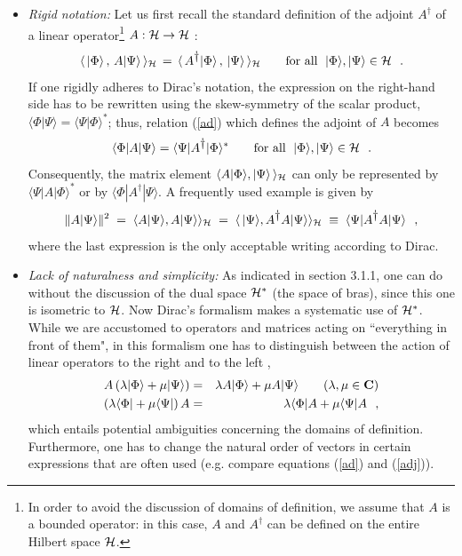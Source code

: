 \documentclass[12pt]{report}
\begin{document}
\begin{itemize}
 
\item {\em Rigid notation:}
Let us first recall the standard definition of the 
adjoint $A^{\dag}$ of a linear operator\footnote{In order to avoid 
the discussion of domains of definition, we assume that $A$ is 
a bounded operator: in this case, $A$ and $A^{\dag}$ can  
be defined on the entire Hilbert space ${\cal H}$.}
$A : {\cal H} \to {\cal H}$ :
\begin{equation}
\label{ad}
\langle \, | \Phi \rangle \, , \, A | \Psi \rangle \, \rangle _{{\cal H}}
\, = \,
\langle \, A^{\displaystyle{\dagger}} | \Phi \rangle \, ,\, |\Psi \rangle \, \rangle _{{\cal H}}
\qquad 
\mbox{for all} \ \; 
|\Phi \rangle , |\Psi \rangle \in {\cal H} 
\ \ .
\end{equation}
 If one rigidly adheres to Dirac's notation, the 
expression on the right-hand side has to be 
rewritten using the skew-symmetry of the scalar product,
$\langle \Phi | \Psi \rangle =
\langle \Psi | \Phi \rangle ^{\ast}$; thus, relation
(\ref{ad}) which defines the adjoint of $A$ becomes 
\begin{equation}
\langle \Phi | A | \Psi \rangle  =
\langle \Psi | A^{\displaystyle{\dagger}} | \Phi \rangle ^{\ast}
\qquad \mbox{for all} \ \; 
|\Phi \rangle , |\Psi \rangle \in {\cal H} 
\ \ .
\label{adj}
\end{equation}
Consequently, the matrix element 
$\langle A | \Phi \rangle , | \Psi \rangle \, \rangle _{{\cal H}}$ 
can only be represented by 
$\langle \Psi | A | \Phi \rangle ^{\ast}$ or by 
$\langle \Phi | A^{\dag} | \Psi \rangle$.
A frequently used example is given by 
\[
\| A | \Psi \rangle \|^2 \; = \;
\langle A | \Psi \rangle , A | \Psi \rangle \rangle _{{\cal H}} \; =\;
\langle \, |\Psi \rangle ,A^{\displaystyle{\dagger}} A|\Psi \rangle \rangle _{{\cal H}}
 \; \equiv \; \langle \Psi |A^{\displaystyle{\dagger}} A |\Psi \rangle
\ \ ,
\]
where the last expression is the only acceptable writing according
to Dirac. 
 
\item
{\em Lack of naturalness and simplicity:}
As indicated in section 3.1.1, 
one can do without the discussion of the 
dual space ${\cal H}^{\ast}$ (the space of bras), 
since this one is isometric to ${\cal H}$. 
Now Dirac's formalism makes a systematic use of ${\cal H}^{\ast}$.
While we are accustomed to operators and matrices acting 
on ``everything in front of them", in this formalism 
one has to distinguish between the action of linear operators 
to the right and to the left
\cite{ct},
\begin{eqnarray}
A \left( \lambda | \Phi \rangle +  \mu | \Psi \rangle \right)
& = &
\lambda A | \Phi \rangle +  \mu A | \Psi \rangle
\qquad (\lambda , \mu \in {\bf C} )
\nonumber
\\
\label{aad}
\left( \lambda \langle \Phi | + \mu \langle \Psi | \right) A
& = &
\lambda \langle \Phi | A +
\mu \langle \Psi | A
\ \ ,
\end{eqnarray}
which entails potential ambiguities concerning the
domains of definition. 
Furthermore, one has to change the natural order of vectors 
in certain expressions that are often used 
(e.g. compare equations  (\ref{ad}) and (\ref{adj})). 
 

\end{itemize}
\end{document}
